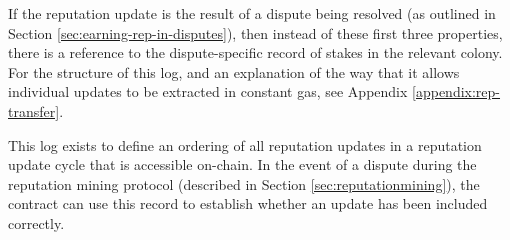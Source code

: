 If the reputation update is the result of a dispute being resolved (as outlined in Section \ref{sec:earning-rep-in-disputes}), then instead of these first three properties, there is a reference to the dispute-specific record of stakes in the relevant colony. For the structure of this log, and an explanation of the way that it allows individual updates to be extracted in constant gas, see Appendix \ref{appendix:rep-transfer}.

This log exists to define an ordering of all reputation updates in a reputation update cycle that is accessible on-chain. In the event of a dispute during the reputation mining protocol (described in Section \ref{sec:reputationmining}), the  contract can use this record to establish whether an update has been included correctly.
